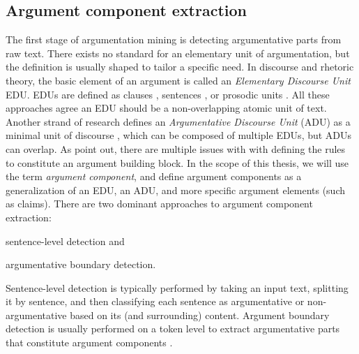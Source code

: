 \subsection{Argument component extraction}
\label{subsec:arg_comp_ext}

The first stage of argumentation mining is detecting argumentative parts from
raw text.  There exists no standard for an elementary unit of argumentation,
but the definition is usually shaped to tailor a specific need. In discourse and
rhetoric theory, the basic element of an argument is called an \textit{Elementary
Discourse Unit} EDU. EDUs are defined as clauses \citep{winter1982towards,
givon1983topic}, sentences \citep{polanyi1996linguistic}, or 
prosodic units \citep{sacks1978simplest}. All these approaches agree an EDU
should be a non-overlapping atomic unit of text. Another strand of research defines
an \textit{Argumentative Discourse Unit} (ADU) as a minimal unit of discourse
\citep{peldszus2013argument}, which can be composed of multiple EDUs, but ADUs
can overlap. As \citet{lawrence2019argument} point out, there are multiple
issues with with defining the rules to constitute an argument building block.
In the scope of this thesis, we will use the term \emph{argument
component}, and define argument components as a generalization of
an EDU, an ADU, and more specific argument elements (such as claims).
There are two dominant approaches to argument component extraction:
\begin{enumerate*}[label=(\arabic*)]
		\item sentence-level detection and
		\item argumentative boundary detection.
\end{enumerate*}

Sentence-level detection is typically performed by taking an input text, 
splitting it by sentence, and then classifying each sentence as
argumentative or non-argumentative based on its (and surrounding) content. 
Argument boundary detection is usually performed on a token level
to extract argumentative parts that constitute argument components
\citep{lippi2016argumentation}.

